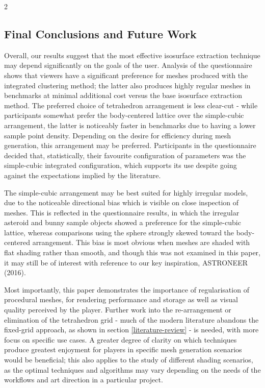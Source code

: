 \documentclass[]{article}
\begin{document}
\pagebreak
\begin{multicols}{2}

\subsection{Final Conclusions and Future Work}\label{conclusions}

Overall, our results suggest that the most effective isosurface extraction technique may depend significantly on the goals of the user. Analysis of the questionnaire shows that viewers have a significant preference for meshes produced with the integrated clustering method; the latter also produces highly regular meshes in benchmarks at minimal additional cost versus the base isosurface extraction method. The preferred choice of tetrahedron arrangement is less clear-cut - while participants somewhat prefer the body-centered lattice over the simple-cubic arrangement, the latter is noticeably faster in benchmarks due to having a lower sample point density. Depending on the desire for efficiency during mesh generation, this arrangement may be preferred. Participants in the questionnaire decided that, statistically, their favourite configuration of parameters was the simple-cubic integrated configuration, which supports its use despite going against the expectations implied by the literature.

The simple-cubic arrangement may be best suited for highly irregular models, due to the noticeable directional bias which is visible on close inspection of meshes. This is reflected in the questionnaire results, in which the irregular asteroid and bunny sample objects showed a preference for the simple-cubic lattice, whereas comparisons using the sphere strongly skewed toward the body-centered arrangement. This bias is most obvious when meshes are shaded with flat shading rather than smooth, and though this was not examined in this paper, it may still be of interest with reference to our key inspiration, ASTRONEER (2016).

Most importantly, this paper demonstrates the importance of regularisation of procedural meshes, for rendering performance and storage as well as visual quality perceived by the player. Further work into the re-arrangement or elimination of the tetrahedron grid - much of the modern literature abandons the fixed-grid approach, as shown in section \ref{literature-review} - is needed, with more focus on specific use cases. A greater degree of clarity on which techniques produce greatest enjoyment for players in specific mesh generation scenarios would be beneficial; this also applies to the study of different shading scenarios, as the optimal techniques and algorithms may vary depending on the needs of the workflows and art direction in a particular project.


\end{multicols}
\end{document}
